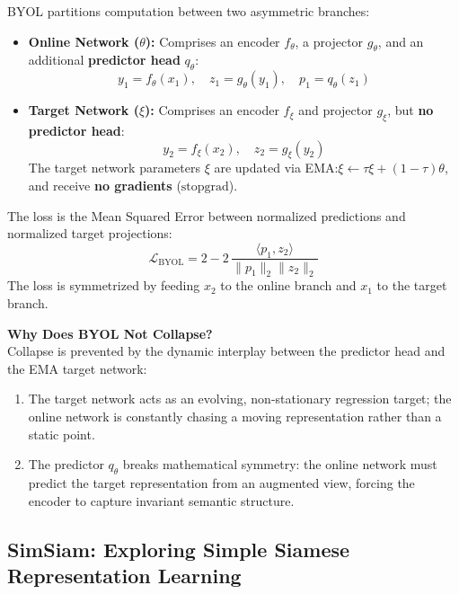 BYOL partitions computation between two asymmetric branches:
\begin{itemize}[leftmargin=*]
    \item \textbf{Online Network ($\theta$):} Comprises an encoder $f_\theta$, a projector $g_\theta$, and an additional \textbf{predictor head} $q_\theta$:
    \begin{equation}
        y_1 = f_\theta(x_1), \quad z_1 = g_\theta(y_1), \quad p_1 = q_\theta(z_1)
    \end{equation}
    \item \textbf{Target Network ($\xi$):} Comprises an encoder $f_\xi$ and projector $g_\xi$, but \textbf{no predictor head}:
    \begin{equation}
        y_2 = f_\xi(x_2), \quad z_2 = g_\xi(y_2)
    \end{equation}
    The target network parameters $\xi$ are updated via EMA:\@ $\xi \leftarrow \tau \xi + (1 - \tau)\theta$, and receive \textbf{no gradients} ($\text{stopgrad}$).
\end{itemize}

The loss is the Mean Squared Error between normalized predictions and normalized target projections:
\begin{equation}
    \mathcal{L}_{\text{BYOL}} = 2 - 2 \, \frac{\langle p_1, z_2 \rangle}{\|p_1\|_2 \|z_2\|_2}
\end{equation}
The loss is symmetrized by feeding $x_2$ to the online branch and $x_1$ to the target branch. 

\begin{InsightBox}
\textbf{Why Does BYOL Not Collapse?} \\
Collapse is prevented by the dynamic interplay between the predictor head and the EMA target network:
\begin{enumerate}
    \item The target network acts as an evolving, non-stationary regression target; the online network is constantly chasing a moving representation rather than a static point.
    \item The predictor $q_\theta$ breaks mathematical symmetry: the online network must predict the target representation from an augmented view, forcing the encoder to capture invariant semantic structure.
\end{enumerate}
\end{InsightBox}

\subsection{\texorpdfstring{SimSiam: Exploring Simple Siamese Representation Learning}{SimSiam: Exploring Simple Siamese Representation Learning}}

